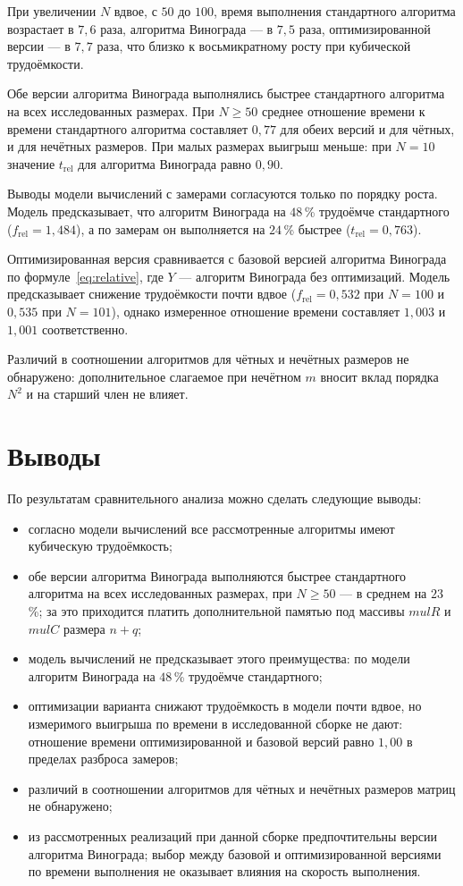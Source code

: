 \documentclass{bmstu}
\begin{document}
При увеличении $N$ вдвое, с $50$ до $100$, время выполнения стандартного
алгоритма возрастает в $7{,}6$ раза, алгоритма Винограда --- в $7{,}5$ раза,
оптимизированной версии --- в $7{,}7$ раза, что близко к восьмикратному росту
при кубической трудоёмкости.

Обе версии алгоритма Винограда выполнялись быстрее стандартного алгоритма на
всех исследованных размерах. При $N \ge 50$ среднее отношение времени к
времени стандартного алгоритма составляет $0{,}77$ для обеих версий и для
чётных, и для нечётных размеров. При малых размерах выигрыш меньше: при $N=10$
значение $t_{\mathrm{rel}}$ для алгоритма Винограда равно $0{,}90$.

Выводы модели вычислений с замерами согласуются только по порядку роста.
Модель предсказывает, что алгоритм Винограда на $48$\,\% трудоёмче
стандартного ($f_{\mathrm{rel}}=1{,}484$), а по замерам он выполняется на
$24$\,\% быстрее ($t_{\mathrm{rel}}=0{,}763$).

Оптимизированная версия сравнивается с базовой версией алгоритма Винограда по
формуле~\eqref{eq:relative}, где $Y$ --- алгоритм Винограда без оптимизаций.
Модель предсказывает снижение трудоёмкости почти вдвое
($f_{\mathrm{rel}}=0{,}532$ при $N=100$ и $0{,}535$ при $N=101$), однако
измеренное отношение времени составляет $1{,}003$ и $1{,}001$ соответственно.

Различий в соотношении алгоритмов для чётных и нечётных размеров не
обнаружено: дополнительное слагаемое при нечётном $m$ вносит вклад порядка
$N^2$ и на старший член не влияет.

\section{Выводы}
По результатам сравнительного анализа можно сделать следующие выводы:
\begin{itemize}
	\item согласно модели вычислений все рассмотренные алгоритмы имеют
	      кубическую трудоёмкость;
	\item обе версии алгоритма Винограда выполняются быстрее стандартного
	      алгоритма на всех исследованных размерах, при $N \ge 50$ --- в
	      среднем на $23$\,\%; за это приходится платить дополнительной
	      памятью под массивы $\mathit{mulR}$ и $\mathit{mulC}$ размера $n+q$;
	\item модель вычислений не предсказывает этого преимущества: по модели алгоритм
	      Винограда на $48$\,\% трудоёмче стандартного;
	\item оптимизации варианта снижают трудоёмкость в модели почти вдвое, но
	      измеримого выигрыша по времени в исследованной сборке не дают:
	      отношение времени оптимизированной и базовой версий равно $1{,}00$
	      в пределах разброса замеров;
	\item различий в соотношении алгоритмов для чётных и нечётных размеров
	      матриц не обнаружено;
	\item из рассмотренных реализаций при данной сборке предпочтительны
	      версии алгоритма Винограда; выбор между базовой и оптимизированной
	      версиями по времени выполнения не оказывает влияния на скорость выполнения.
\end{itemize}
\end{document}
